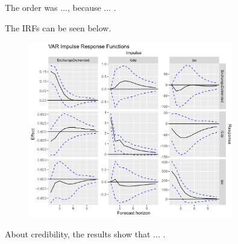 \documentclass[12pt]{article}
\begin{document}
The order was ..., because ... .

The IRFs can be seen below.

\begin{figure}[H]
    \centering
    \includegraphics[width=0.8\textwidth]{figures/irfs.png}
\end{figure}

About credibility, the results show that ... .
\end{document}
